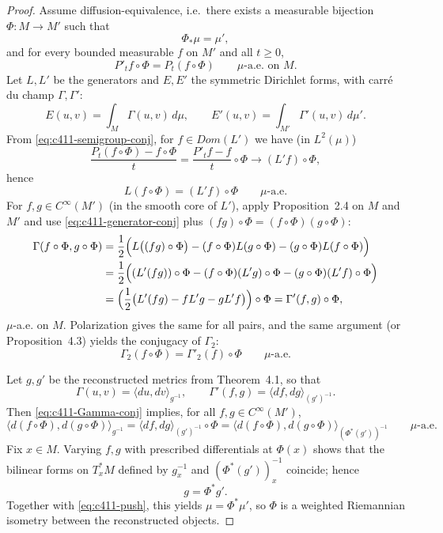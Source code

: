 \documentclass[11pt]{amsart}
\theoremstyle{definition}
\theoremstyle{remark}
\newcommand{\Dom}{Dom}
\newcommand{\E}{E}
\begin{document}
\begin{proof}
Assume diffusion-equivalence, i.e.\ there exists a measurable bijection $\Phi:M\to M'$ such that
\begin{equation}\label{eq:c411-push}
\Phi_*\mu=\mu',
\end{equation}
and for every bounded measurable $f$ on $M'$ and all $t\ge0$,
\begin{equation}\label{eq:c411-semigroup-conj}
P'_t f\circ \Phi = P_t(f\circ \Phi)\qquad \mu\text{-a.e. on }M.
\end{equation}
Let $L,L'$ be the generators and $\E,\E'$ the symmetric Dirichlet forms, with carré du champ
$\Gamma,\Gamma'$:
\[
\E(u,v)=\int_M \Gamma(u,v)\,d\mu,\qquad
\E'(u,v)=\int_{M'} \Gamma'(u,v)\,d\mu'.
\]
From \eqref{eq:c411-semigroup-conj}, for $f\in\Dom(L')$ we have (in $L^2(\mu)$)
\[
\frac{P_t(f\circ\Phi)-f\circ\Phi}{t}
=
\frac{P'_t f-f}{t}\circ\Phi
\longrightarrow (L'f)\circ\Phi,
\]
hence
\begin{equation}\label{eq:c411-generator-conj}
L(f\circ\Phi)=(L'f)\circ\Phi\qquad \mu\text{-a.e.}
\end{equation}
For $f,g\in C^\infty(M')$ (in the smooth core of $L'$), apply Proposition~2.4 on $M$ and $M'$ and use
\eqref{eq:c411-generator-conj} plus $(fg)\circ\Phi=(f\circ\Phi)(g\circ\Phi)$:
\begin{align}
\Gamma(f\circ\Phi,g\circ\Phi)
&=\frac12\Bigl(L\bigl((fg)\circ\Phi\bigr)-(f\circ\Phi)L(g\circ\Phi)-(g\circ\Phi)L(f\circ\Phi)\Bigr)\nonumber\\
&=\frac12\Bigl((L'(fg))\circ\Phi-(f\circ\Phi)(L'g)\circ\Phi-(g\circ\Phi)(L'f)\circ\Phi\Bigr)\nonumber\\
&=\Bigl(\frac12\bigl(L'(fg)-fL'g-gL'f\bigr)\Bigr)\circ\Phi
=\Gamma'(f,g)\circ\Phi,
\label{eq:c411-Gamma-conj}
\end{align}
$\mu$-a.e. on $M$. Polarization gives the same for all pairs, and the same argument (or Proposition~4.3)
yields the conjugacy of $\Gamma_2$:
\begin{equation}\label{eq:c411-Gamma2-conj}
\Gamma_2(f\circ\Phi)=\Gamma'_2(f)\circ\Phi \qquad \mu\text{-a.e.}
\end{equation}

Let $g,g'$ be the reconstructed metrics from Theorem~4.1, so that
\[
\Gamma(u,v)=\langle du,dv\rangle_{g^{-1}},
\qquad
\Gamma'(f,g)=\langle df,dg\rangle_{(g')^{-1}}.
\]
Then \eqref{eq:c411-Gamma-conj} implies, for all $f,g\in C^\infty(M')$,
\begin{equation}\label{eq:c411-cometric-pullback}
\bigl\langle d(f\circ\Phi),d(g\circ\Phi)\bigr\rangle_{g^{-1}}
=
\bigl\langle df,dg\bigr\rangle_{(g')^{-1}}\circ\Phi
=
\bigl\langle d(f\circ\Phi),d(g\circ\Phi)\bigr\rangle_{(\Phi^*(g'))^{-1}}
\qquad \mu\text{-a.e.}
\end{equation}
Fix $x\in M$. Varying $f,g$ with prescribed differentials at $\Phi(x)$ shows that the bilinear forms on
$T_x^*M$ defined by $g^{-1}_x$ and $(\Phi^*(g'))^{-1}_x$ coincide; hence
\begin{equation}\label{eq:c411-metric-pullback}
g=\Phi^*g'.
\end{equation}
Together with \eqref{eq:c411-push}, this yields $\mu=\Phi^*\mu'$, so $\Phi$ is a weighted Riemannian isometry
between the reconstructed objects.


\end{proof}
\end{document}

